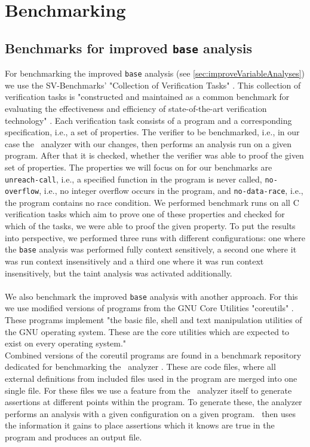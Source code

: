   \section{Benchmarking}
    \subsection{Benchmarks for improved \texttt{base} analysis}
      For benchmarking the improved \texttt{base} analysis (see \autoref{sec:improveVariableAnalyses}) we use the SV-Benchmarks' "Collection of Verification Tasks" \parencite{svBench}. This collection of verification tasks is "constructed and maintained as a common benchmark for evaluating the effectiveness and efficiency of state-of-the-art verification technology" \parencite{svBench}. Each verification task consists of a program and a corresponding specification, i.e., a set of properties. The verifier to be benchmarked, i.e., in our case the \gob\ analyzer with our changes, then performs an analysis run on a given program. After that it is checked, whether the verifier was able to proof the given set of properties. The properties we will focus on for our benchmarks are \texttt{unreach-call}, i.e., a specified function in the program is never called, \texttt{no-overflow}, i.e., no integer overflow occurs in the program, and \texttt{no-data-race}, i.e., the program contains no race condition. We performed benchmark runs on all C verification tasks which aim to prove one of these properties and checked for which of the tasks, we were able to proof the given property. To put the results into perspective, we performed three runs with different configurations: one where the \texttt{base} analysis was performed fully context sensitively, a second one where it was run context insensitively and a third one where it was run context insensitively, but the taint analysis was activated additionally.\\
      \\
      We also benchmark the improved \texttt{base} analysis with another approach. For this we use modified versions of programs from the GNU Core Utilities "coreutils" \parencite{gnuCoreutils}. These programs implement "the basic file, shell and text manipulation utilities of the GNU operating system. These are the core utilities which are expected to exist on every operating system."\parencite{gnuCoreutils}\\
      Combined versions of the coreutil programs are found in a benchmark repository dedicated for benchmarking the \gob\ analyzer \parencite{goblintBench}. These are code files, where all external definitions from included files used in the program are merged into one single file. For these files we use a feature from the \gob\ analyzer itself to generate assertions at different points within the program. To generate these, the analyzer performs an analysis with a given configuration on a given program. \gob\ then uses the information it gains to place assertions which it knows are true in the program and produces an output file.\\
